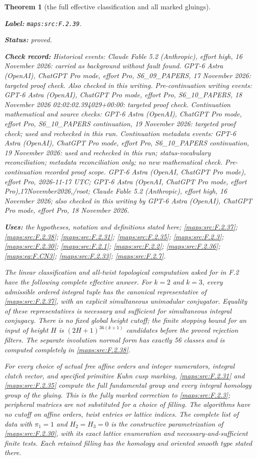 \documentclass[11pt,a4paper]{article}
\newtheorem{theorem}{Theorem}[section]
\theoremstyle{definition}
\newcommand{\StatementRecord}[4]{\par\smallskip\begingroup\upshape\raggedright\noindent\textbf{Label:} \nolinkurl{#1}.\par\noindent\textbf{Status:} #2.\par\noindent\textbf{Check record:} #3.\par\noindent\textbf{Uses:} #4.\par\endgroup\smallskip}
\begin{document}
\begin{theorem}[the full effective classification and all marked gluings]\label{maps:src:F.2.39}
\StatementRecord{maps:src:F.2.39}{proved}{Historical events: Claude Fable 5.2 (Anthropic), effort high, 16 November 2026: carried as background without fault found. GPT-6 Astra (OpenAI), ChatGPT Pro mode, effort Pro, S6\_09\_PAPERS, 17 November 2026: targeted proof check. Also checked in this writing. Pre-continuation writing events: GPT-6 Astra (OpenAI), ChatGPT Pro mode, effort Pro, S6\_10\_PAPERS, 18 November 2026 02:02:02.394029+00:00: targeted proof check. Continuation mathematical and source checks: GPT-6 Astra (OpenAI), ChatGPT Pro mode, effort Pro, S6\_10\_PAPERS continuation, 19 November 2026: targeted proof check; used and rechecked in this run. Continuation metadata events: GPT-6 Astra (OpenAI), ChatGPT Pro mode, effort Pro, S6\_10\_PAPERS continuation, 19 November 2026: used and rechecked in this run; status-vocabulary reconciliation; metadata reconciliation only; no new mathematical check. \emph{Pre-continuation recorded proof scope.} GPT-6 Astra (OpenAI, ChatGPT Pro mode), effort Pro, 2026-11-17 UTC; GPT-6 Astra (OpenAI, ChatGPT Pro mode, effort Pro),17November2026,/root; Claude Fable 5.2 (Anthropic), effort high, 16 November 2026; also checked in this writing by GPT-6 Astra (OpenAI), ChatGPT Pro mode, effort Pro, 18 November 2026}{the hypotheses, notation and definitions stated here; \cref{maps:src:F.2.37}; \cref{maps:src:F.2.38}; \cref{maps:src:F.2.31}; \cref{maps:src:F.2.35}; \cref{maps:src:F.2.3}; \cref{maps:src:F.2.30}; \cref{maps:src:F.2.1}; \cref{maps:src:F.2.2}; \cref{maps:src:F.2.36}; \cref{maps:eq:F.CN3}; \cref{maps:src:F.2.33}; \cref{maps:src:F.2.7}}


The linear classification and all-twist topological computation
asked for in F.2 have the following complete effective answer.
For $k=2$ and $k=3$, every admissible ordered integral tuple
has the canonical representative of \ref{maps:src:F.2.37}, with an explicit
simultaneous unimodular conjugator.  Equality of these
representatives is necessary and sufficient for simultaneous
integral conjugacy.  There is no fixed global height cutoff;
the finite stopping bound for an input of height $H$ is
$(2H+1)^{36(k+1)}$ candidates before the proved rejection
filters.  The separate involution normal form has exactly
56 classes and is computed completely in \ref{maps:src:F.2.38}.

For every choice of actual free affine orders and integer
numerators, integral clutch vector, and specified primitive
Kuhn cusp marking, \ref{maps:src:F.2.31} and \ref{maps:src:F.2.35} compute the full
fundamental group and every integral homology group of the
gluing.  This is the fully marked correction to \ref{maps:src:F.2.3};
peripheral matrices are not substituted for a choice of
filling.  The algorithms have no cutoff on affine orders,
twist entries or lattice indices.  The complete list of data
with $\pi_1=1$ and $H_2=H_3=0$ is the constructive
parametrization of \ref{maps:src:F.2.30}, with its exact lattice enumeration
and necessary-and-sufficient finite tests.  Each retained
filling has the homology and oriented smooth type stated
there.

\end{theorem}
\end{document}
